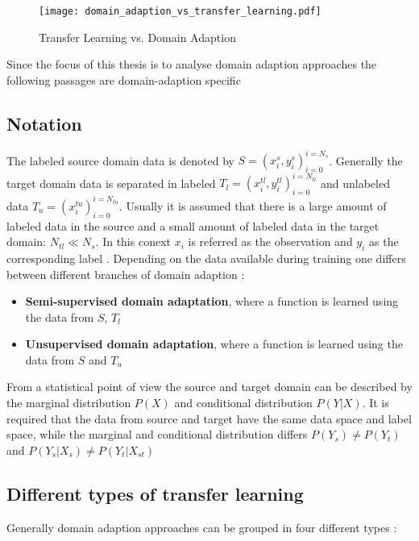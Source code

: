 \begin{figure}[htpb]
  \centering
  \texttt{[image: domain\_adaption\_vs\_transfer\_learning.pdf]}
  \caption {Transfer Learning vs. Domain Adaption} \label{fig:domain_adaption_vs_transfer_learning}
\end{figure}
\FloatBarrier 

Since the focus of this thesis is to analyse domain adaption approaches the following passages are domain-adaption specific
\subsection{Notation}
The labeled source domain data is denoted by  $S = {(x_{i}^{s}, y_{i}^{s})_{i = 0}^{i = N_{s}}}$. Generally the target domain data is separated in labeled $T_{l} = {(x_{i}^{tl}, y_{i}^{tl})_{i = 0}^{i = N_{tl}}}$ and unlabeled data $T_{u} = {(x_{i}^{tu})_{i = 0}^{i = N_{tu}}}$. Usually it is assumed that there is a large amount of labeled data in the source and a small amount of labeled data in the target domain: $N_{tl} \ll N_{s}$. In this conext $x_{i}$ is referred as the observation and $y_{i}$ as the corresponding label  \cite{Patel2015}. Depending on the data available during training one differs between different branches of domain adaption \cite{Patel2015}: 
\begin{itemize}
\item \textbf{Semi-supervised domain adaptation}, where a function is learned using the data from $S$, $T_{l}$
\item \textbf{Unsupervised domain adaptation}, where a function is learned using the data from $S$ and $T_{u}$ 
\end{itemize}

From a statistical point of view the source and target domain can be described by the marginal distribution $P(X)$ and conditional distribution $P(Y|X)$. It is required that the data from source and target have the same data space and label space, while the marginal and conditional distribution differs $P(Y_{s}) \neq P(Y_{t})$ and $P(Y_{s}|X_{s}) \neq P(Y_{t}|X_{st})$ \cite{Qikang2020}

\subsection{Different types of transfer learning}
Generally domain adaption approaches can be grouped in four different types \cite{AZAMFAR2020103932}:  

